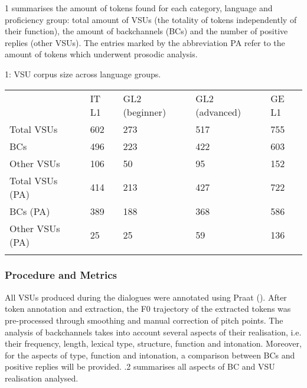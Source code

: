 \begin{table}
\caption{1 summarises the amount of tokens found for each category, language and proficiency group: total amount of VSUs (the totality of tokens independently of their function), the amount of backchannels (BCs) and the number of positive replies (other VSUs). The entries marked by the abbreviation PA refer to the amount of tokens which underwent prosodic analysis.}
\label{tab:key:4}
\end{table}

\begin{stylelsTableHeading}%
\begin{table}
\caption{1: VSU corpus size across language groups.}
\label{tab:key:4}
\end{table}\end{stylelsTableHeading}


\begin{tabularx}{\textwidth}{XXXXX}
 & IT L1 & GL2 (beginner) & GL2 (advanced) & GE L1\\
\lsptoprule
Total VSUs & 602 & 273 & 517 & 755\\
BCs & 496 & 223 & 422 & 603\\
Other VSUs & 106 & 50 & 95 & 152\\
Total VSUs (PA) & 414 & 213 & 427 & 722\\
BCs (PA) & 389 & 188 & 368 & 586\\
Other VSUs (PA) & 25 & 25 & 59 & 136\\
\lspbottomrule
\end{tabularx}
\subsubsection{Procedure and Metrics}
\hypertarget{Toc191305949}{}
All VSUs produced during the dialogues were annotated using Praat (\citealt{BoersmaWeenink2021}). After token annotation and extraction, the F0 trajectory of the extracted tokens was pre-processed through smoothing and manual correction of pitch points. The analysis of backchannels takes into account several aspects of their realisation, i.e. their frequency, length, lexical type, structure, function and intonation. Moreover, for the aspects of type, function and intonation, a comparison between BCs and positive replies will be provided. .2 summarises all aspects of BC and VSU realisation analysed.

